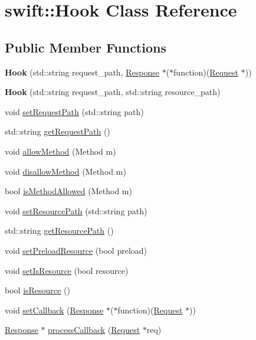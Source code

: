 \hypertarget{classswift_1_1_hook}{\section{swift\-:\-:Hook Class Reference}
\label{classswift_1_1_hook}
}
\subsection*{Public Member Functions}
\begin{DoxyCompactItemize}
\item 
\hypertarget{classswift_1_1_hook_a8e9f35346f4797a6149a79c7a34235fd}{{\bfseries Hook} (std\-::string request\-\_\-path, \hyperlink{classswift_1_1_response}{Response} $\ast$($\ast$function)(\hyperlink{classswift_1_1_request}{Request} $\ast$))}\label{classswift_1_1_hook_a8e9f35346f4797a6149a79c7a34235fd}

\item 
\hypertarget{classswift_1_1_hook_a08e8c205418d4dc95a24ad10f0a6754e}{{\bfseries Hook} (std\-::string request\-\_\-path, std\-::string resource\-\_\-path)}\label{classswift_1_1_hook_a08e8c205418d4dc95a24ad10f0a6754e}

\item 
void \hyperlink{classswift_1_1_hook_a047787726165c7b671e88e977468ff5d}{set\-Request\-Path} (std\-::string path)
\item 
std\-::string \hyperlink{classswift_1_1_hook_a4679b1c6977270006156702041180efa}{get\-Request\-Path} ()
\item 
void \hyperlink{classswift_1_1_hook_ab8f2a030f4234be5aaea657628414669}{allow\-Method} (Method m)
\item 
void \hyperlink{classswift_1_1_hook_a02148f71598a14eb8c7f42d9c82f50cb}{disallow\-Method} (Method m)
\item 
bool \hyperlink{classswift_1_1_hook_ad5e71e832b6290d4f195a5dcd594e661}{is\-Method\-Allowed} (Method m)
\item 
void \hyperlink{classswift_1_1_hook_a4147575b0d54691515271508baa428c8}{set\-Resource\-Path} (std\-::string path)
\item 
std\-::string \hyperlink{classswift_1_1_hook_a6754120ec1ace56091e2e794bc9df635}{get\-Resource\-Path} ()
\item 
void \hyperlink{classswift_1_1_hook_a8fc8a844df53bc651a46f9616ee635f9}{set\-Preload\-Resource} (bool preload)
\item 
void \hyperlink{classswift_1_1_hook_aeefe2c2e5080787975097a7c1b431161}{set\-Is\-Resource} (bool resource)
\item 
bool \hyperlink{classswift_1_1_hook_addbf2c39d6628c838b6fb46c96469e31}{is\-Resource} ()
\item 
void \hyperlink{classswift_1_1_hook_aa1fd10e80b74ee88885d3b7225cf0c90}{set\-Callback} (\hyperlink{classswift_1_1_response}{Response} $\ast$($\ast$function)(\hyperlink{classswift_1_1_request}{Request} $\ast$))
\item 
\hyperlink{classswift_1_1_response}{Response} $\ast$ \hyperlink{classswift_1_1_hook_a1f1005a2e758eeb8776572edb2419932}{process\-Callback} (\hyperlink{classswift_1_1_request}{Request} $\ast$req)
\end{DoxyCompactItemize}



